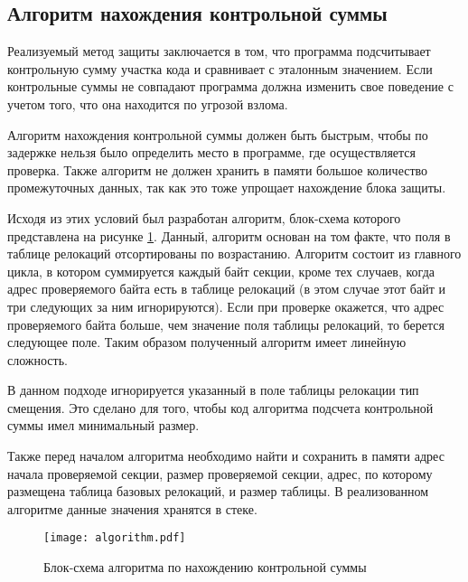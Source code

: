 
\subsection{Алгоритм нахождения контрольной суммы}

Реализуемый метод защиты заключается в том, что программа подсчитывает
контрольную сумму участка кода и сравнивает с эталонным значением. Если
контрольные суммы не совпадают программа должна изменить свое поведение с
учетом того, что она находится по угрозой взлома.

Алгоритм нахождения контрольной суммы должен быть быстрым, чтобы по задержке
нельзя было определить место в программе, где осуществляется проверка. Также
алгоритм не должен хранить в памяти большое количество промежуточных данных, так
как это тоже упрощает нахождение блока защиты.

Исходя из этих условий был разработан алгоритм, блок-схема которого представлена
на рисунке \ref{fig:algorithm}. Данный, алгоритм основан на том факте, что поля
в таблице релокаций отсортированы по возрастанию. Алгоритм состоит из главного
цикла, в котором суммируется каждый байт секции, кроме тех случаев, когда адрес
проверяемого байта есть в таблице релокаций (в этом случае этот байт и три
следующих за ним игнорируются). Если при проверке окажется, что адрес
проверяемого байта больше, чем значение поля таблицы релокаций, то берется
следующее поле. Таким образом полученный алгоритм имеет линейную сложность.

В данном подходе игнорируется указанный в поле таблицы релокации тип смещения.
Это сделано для того, чтобы код алгоритма подсчета контрольной суммы имел
минимальный размер. 

Также перед началом алгоритма необходимо найти и сохранить в памяти адрес начала
проверяемой секции, размер проверяемой секции, адрес, по которому размещена
таблица базовых релокаций, и размер таблицы. В реализованном алгоритме данные
значения хранятся в стеке.

\begin{figure}[h!]
  \centering
  \texttt{[image: algorithm.pdf]}
  \caption{Блок-схема алгоритма по нахождению контрольной суммы}
  \label{fig:algorithm}
\end{figure}
